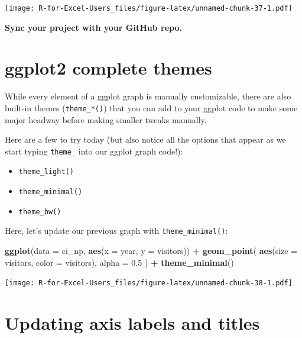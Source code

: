 \documentclass[]{book}
\newenvironment{Shaded}{\begin{snugshade}}{\end{snugshade}}
\newcommand{\DataTypeTok}[1]{\textcolor[rgb]{0.13,0.29,0.53}{#1}}
\newcommand{\FloatTok}[1]{\textcolor[rgb]{0.00,0.00,0.81}{#1}}
\newcommand{\KeywordTok}[1]{\textcolor[rgb]{0.13,0.29,0.53}{\textbf{#1}}}
\newcommand{\NormalTok}[1]{#1}
\newcommand{\OperatorTok}[1]{\textcolor[rgb]{0.81,0.36,0.00}{\textbf{#1}}}
\newcommand{\StringTok}[1]{\textcolor[rgb]{0.31,0.60,0.02}{#1}}
\providecommand{\tightlist}{%
  \setlength{\itemsep}{0pt}\setlength{\parskip}{0pt}}
\begin{document}
\texttt{[image: R-for-Excel-Users\_files/figure-latex/unnamed-chunk-37-1.pdf]}

\textbf{Sync your project with your GitHub repo.}

\hypertarget{ggplot2-complete-themes}{%
\section{ggplot2 complete themes}\label{ggplot2-complete-themes}}

While every element of a ggplot graph is manually customizable, there are also built-in themes (\texttt{theme\_*()}) that you can add to your ggplot code to make some major headway before making smaller tweaks manually.

Here are a few to try today (but also notice all the options that appear as we start typing \texttt{theme\_} into our ggplot graph code!):

\begin{itemize}
\tightlist
\item
  \texttt{theme\_light()}
\item
  \texttt{theme\_minimal()}
\item
  \texttt{theme\_bw()}
\end{itemize}

Here, let's update our previous graph with \texttt{theme\_minimal()}:

\begin{Shaded}
\begin{Highlighting}[]
\KeywordTok{ggplot}\NormalTok{(}\DataTypeTok{data =}\NormalTok{ ci_np, }\KeywordTok{aes}\NormalTok{(}\DataTypeTok{x =}\NormalTok{ year, }\DataTypeTok{y =}\NormalTok{ visitors)) }\OperatorTok{+}
\StringTok{  }\KeywordTok{geom_point}\NormalTok{(}
    \KeywordTok{aes}\NormalTok{(}\DataTypeTok{size =}\NormalTok{ visitors,}
        \DataTypeTok{color =}\NormalTok{ visitors),}
    \DataTypeTok{alpha =} \FloatTok{0.5}
\NormalTok{  ) }\OperatorTok{+}
\StringTok{  }\KeywordTok{theme_minimal}\NormalTok{()}
\end{Highlighting}
\end{Shaded}

\texttt{[image: R-for-Excel-Users\_files/figure-latex/unnamed-chunk-38-1.pdf]}

\hypertarget{updating-axis-labels-and-titles}{%
\section{Updating axis labels and titles}\label{updating-axis-labels-and-titles}}
\end{document}
